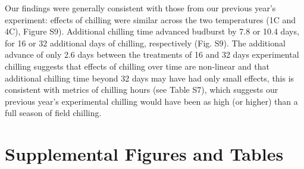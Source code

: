 \documentclass{article}
\begin{document}
\noindent Our findings were generally consistent with those from our previous year's experiment: effects of chilling were similar across the two temperatures (1\degree C and 4\degree C), Figure S9). Additional chilling time advanced budburst by 7.8 or 10.4 days, for 16 or 32 additional days of chilling, respectively (Fig. S9). The additional advance of only 2.6 days between the treatments of 16 and 32 days experimental chilling suggests that effects of chilling over time are non-linear and that additional chilling time beyond 32 days may have had only small effects, this is consistent with metrics of chilling hours (see Table S7), which suggests our previous year's experimental chilling would have been as high (or higher) than a full season of field chilling. 







\newpage
\section*{Supplemental Figures and Tables}
\end{document}
